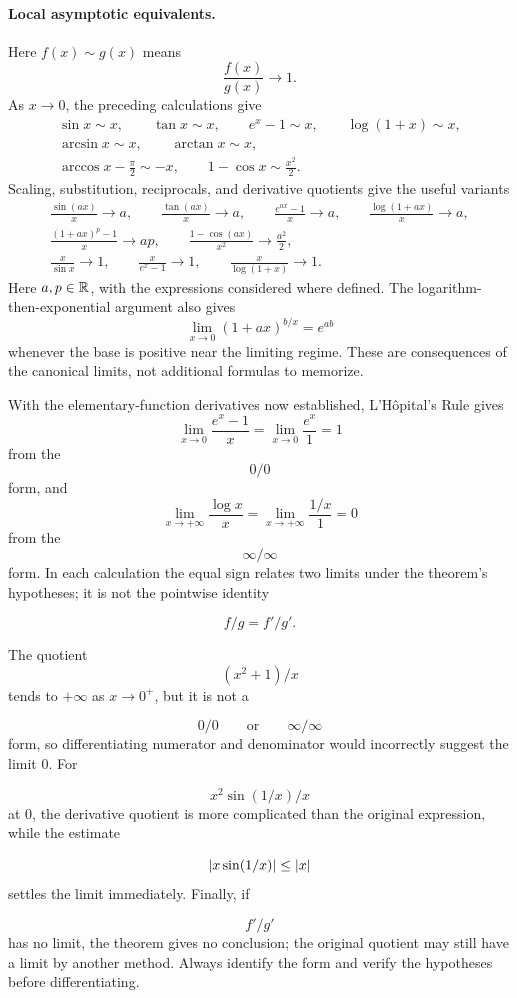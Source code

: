 \paragraph{Local asymptotic equivalents.}
Here $f(x)\sim g(x)$ means
\[
\frac{f(x)}{g(x)}\longrightarrow1.
\]
As $x\to0$, the preceding calculations give
\[
\begin{gathered}
\sin x\sim x,\qquad \tan x\sim x,\qquad e^x-1\sim x,
\qquad \log(1+x)\sim x,\\
\arcsin x\sim x,\qquad \arctan x\sim x,\\
\arccos x-\frac\pi2\sim-x,\qquad 1-\cos x\sim\frac{x^2}{2}.
\end{gathered}
\]
Scaling, substitution, reciprocals, and derivative quotients give the useful
variants
\[
\begin{gathered}
\frac{\sin(ax)}x\to a,\qquad
\frac{\tan(ax)}x\to a,\qquad
\frac{e^{ax}-1}{x}\to a,\qquad
\frac{\log(1+ax)}x\to a,\\
\frac{(1+ax)^p-1}{x}\to ap,\qquad
\frac{1-\cos(ax)}{x^2}\to\frac{a^2}{2},\\
\frac{x}{\sin x}\to1,\qquad
\frac{x}{e^x-1}\to1,\qquad
\frac{x}{\log(1+x)}\to1.
\end{gathered}
\]
Here \(a,p\in\mathbb{R}\), with the expressions considered where defined. The
logarithm-then-exponential argument also gives
\[
\lim_{x\to0}(1+ax)^{b/x}=e^{ab}
\]
whenever the base is positive near the limiting regime. These are
consequences of the canonical limits, not additional formulas to memorize.

\begin{example}
With the elementary-function derivatives now established,
L'H\^opital's Rule gives
\[
\lim_{x\to0}\frac{e^x-1}{x}
=\lim_{x\to0}\frac{e^x}{1}=1
\]
from the
\[
0/0
\]
 form, and
\[
\lim_{x\to+\infty}\frac{\log x}{x}
=\lim_{x\to+\infty}\frac{1/x}{1}=0
\]
from the
\[
\infty/\infty
\]
 form.  In each calculation the equal sign relates
two limits under the theorem's hypotheses; it is not the pointwise identity

\[
f/g=f'/g'.
\]

\end{example}

\begin{remark}
The quotient
\[
(x^2+1)/x
\]
 tends to $+\infty$ as $x\to0^+$, but it is not a

\[
0/0\qquad\text{or}\qquad \infty/\infty
\]
 form, so differentiating numerator and denominator
would incorrectly suggest the limit $0$.  For

\[
x^2\sin(1/x)/x
\]
 at $0$, the derivative quotient is more complicated than
the original expression, while the estimate

\[
\lvert x\sin(1/x)\rvert\leq\lvert x\rvert
\]
 settles the limit immediately.  Finally, if

\[
f'/g'
\]
 has no limit, the theorem gives no conclusion; the original quotient
may still have a limit by another method.  Always identify the form and
verify the hypotheses before differentiating.
\end{remark}

